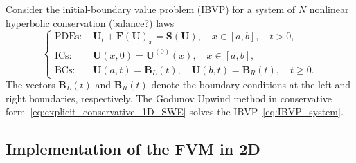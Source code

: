 Consider the initial-boundary value problem (IBVP) for a system of $N$ nonlinear hyperbolic conservation (balance?) laws     
\begin{equation}\label{eq:IBVP_system}
    \begin{cases}
    \text{PDEs: }    &\mathbf{U}_t + \mathbf{F(U)}_x = \mathbf{S(U)}, \quad x \in [a, b], \quad t > 0, \\
    \text{ICs: }    &\mathbf{U}(x,0) = \mathbf{U}^{(0)}(x), \quad x \in [a,b], \\
    \text{BCs: }    &\mathbf{U}(a,t) = \mathbf{B}_{L}(t), \quad \mathbf{U}(b,t) = \mathbf{B}_{R}(t), \quad t \geq 0.
    \end{cases}
\end{equation}
The vectors $\mathbf{B}_L (t)$ and $\mathbf{B}_R (t)$ denote the boundary conditions at the left and right boundaries, respectively.
The Godunov Upwind method in conservative form~\eqref{eq:explicit_conservative_1D_SWE} solves the IBVP~\eqref{eq:IBVP_system}.


\subsection{Implementation of the FVM in 2D}






